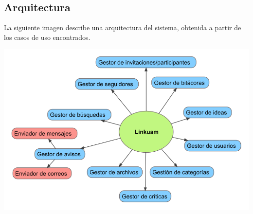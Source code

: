 \documentclass[12pt,letterpaper,titlepage]{article}
\begin{document}
\newpage
\subsection{Arquitectura}
La siguiente imagen describe una arquitectura del sistema, obtenida a partir de los casos de uso encontrados. 
\begin{center} 
\includegraphics[width=410pt]{arq1.png}
\end{center}
\end{document}

